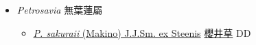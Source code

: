 
  \begin{itemize}
 \item[] \textit{Petrosavia} 無葉蓮屬
                    
  \begin{itemize}
        \item[] \href{http://www.theplantlist.org/tpl1.1/search?q=Petrosavia+sakuraii}{\textit{P. sakuraii} (Makino) J.J.Sm. ex Steenis}   \href{\detokenize{http://taibnet.sinica.edu.tw/chi/taibnet_species_list.php?T2=櫻井草&T2_new_value=true&fr=y}}{櫻井草} DD
  \end{itemize}
  \end{itemize}

